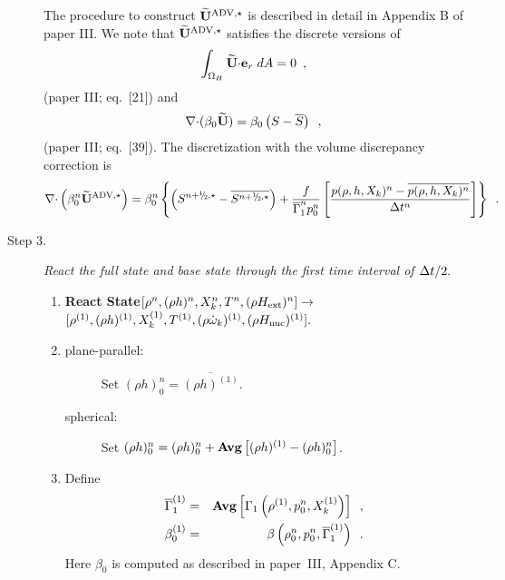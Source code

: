 \begin{description}
The procedure to construct $\widetilde{\mathbf{U}}^{\mathrm{ADV},\star}$ is described in detail in Appendix B of paper III.
We note that  $\widetilde{\mathbf{U}}^{\mathrm{ADV},\star}$ satisfies the discrete versions of 
\begin{equation}
\int_{\Omega_H} \widetilde{{\bf U}} \mathbf{\cdot} \mathbf{e}_r \; dA = 0 \label{eq:udoterzero} \enskip ,
\end{equation}
(paper III; eq.~[21])
and
\begin{equation}
\mathbf{\nabla} \mathbf{\cdot} (\beta_0 \widetilde{{\bf U}} )  = \beta_0 \left(S - \overline{S} \right )\enskip ,
\label{eq:tildeconstraint}
\end{equation}
(paper III; eq.~[39]).  The discretization with the volume discrepancy correction is
\begin{equation}
\nablab \cdotb \left(\beta_0^n \uadvone\right) = 
\beta_0^n \left\{ \left(S^{\nph,\star} - \overline{S^{\nph,\star}}\right)
+ \frac{f}{\gammabar^n p_0^n}
\left[\frac{p(\rho,h,X_k)^n - \overline{p(\rho,h,X_k)^n}}{\Delta t^n}\right]\right\} \enskip .
\end{equation}

\item[Step 3.] {\em React the full state and base state through the first time 
interval of $\Delta t / 2.$}

\begin{enumerate}
\renewcommand{\theenumi}{{\bf \alph{enumi}}}

\item {\bf React State}$[\rho^n, (\rho h)^n, X_k^n, T^n, (\rho{H_{\rm ext}})^n]
                   \rightarrow$ $[ \rho^{(1)}, (\rho h)^{(1)}, X_k^{(1)}, T^{(1)},
                                  (\rho \dot{\omega}_k)^{(1)}, (\rho {H_{\rm nuc}})^{(1)} ].$
\item
\begin{description}

\item[plane-parallel:] Set $(\rho h)_0^{n} = \overline{(\rho h)^{(1)}}$.

\item[spherical:] Set $(\rho h)_0^{n} = (\rho h)_0^{n} + {\rm{\bf Avg}}\left[(\rho h)^{(1)} - (\rho h)_0^{n}\right]$.

\end{description}

\item Define
\begin{eqnarray}
\overline{\Gamma}_1^{(1)}        &=& {\rm{\bf Avg}} \left[ \Gamma_1\left(\rho^{(1)}, p_0^{n}, X_k^{(1)}\right) \right] \enskip , \\
 {\beta   }_0^{(1)}    &=& \beta   \left(\rho_0^{n}, p_0^{n}, \overline{\Gamma}_1^{(1)}\right) \enskip .
\end{eqnarray}
Here $\beta_0$ is computed as described in paper~III, Appendix C.


\end{enumerate}
\end{description}
